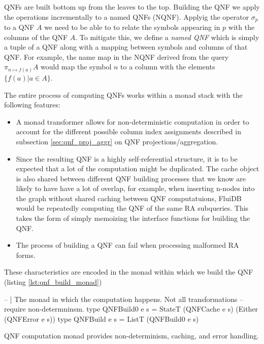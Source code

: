 QNFs are built bottom up from the leaves to the top.  Building the QNF
we apply the operations incrementally to a named QNFs (NQNF).  Applyig
the operator \(\sigma_p\) to a QNF \(A\) we need to be able to to
relate the symbols appearing in \(p\) with the columns of the QNF
\(A\). To mitigate this, we define a \emph{named QNF} which is simply a
tuple of a QNF along with a mapping between symbols and columns of
that QNF.  For example, the name map in the NQNF derived from the
query \(\pi_{n \mapsto f(a)} A\) would map the symbol \(n\) to a
column with the elements \(\{f(a) | a \in A\}\).

The entire process of computing QNFs works within a monad stack with
the following features:

\begin{itemize}
\item A  monad transformer allows for non-deterministic computation in
  order to account for the different possible column index assignments
  described in subsection \ref{sec:qnf_proj_aggr} on QNF
  projections/aggregation.
\item Since the resulting QNF is a highly self-referential structure,
  it is to be expected that a lot of the computation might be
  duplicated. The cache object is also shared between different QNF
  building processes that we know are likely to have have a lot of
  overlap, for example, when inserting n-nodes into the graph without
  shared caching between QNF computatuions, FluiDB would be repeatedly computing the QNF of the
  same RA subqueries. This takes the form of simply memoizing the
  interface functions for building the QNF.
\item The process of building a QNF can fail when processing malformed
  RA forms.
\end{itemize}

These characteristics are encoded in the monad within which we build
the QNF (listing \ref{lst:qnf_build_monad})

\begin{code}
  \begin{haskellcode}
    -- | The monad in which the computation happens. Not all transformations
    -- require non-determninsm.
    type QNFBuild0 e s = StateT (QNFCache e s) (Either (QNFError e s))
    type QNFBuild e s = ListT (QNFBuild0 e s)
  \end{haskellcode}
  \caption{\label{lst:qnf_build_monad}QNF computation monad provides
    non-determinism, caching, and error handling.}
\end{code}

